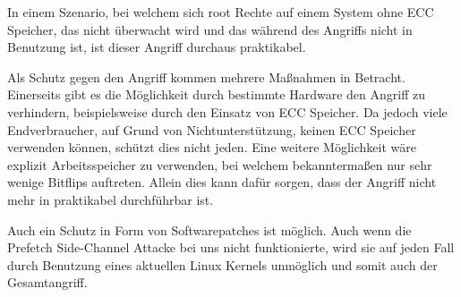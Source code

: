 In einem Szenario, bei welchem sich root Rechte auf einem System ohne ECC Speicher, das nicht überwacht wird und das während des Angriffs nicht in Benutzung ist, ist dieser Angriff durchaus praktikabel.

Als Schutz gegen den Angriff kommen mehrere Maßnahmen in Betracht. Einerseits gibt es die Möglichkeit durch bestimmte Hardware den Angriff zu verhindern, beispielsweise durch den Einsatz von ECC Speicher. Da jedoch viele Endverbraucher, auf Grund von Nichtunterstützung, keinen ECC Speicher verwenden können, schützt dies nicht jeden. Eine weitere Möglichkeit wäre explizit Arbeitsspeicher zu verwenden, bei welchem bekanntermaßen nur sehr wenige Bitflips auftreten. Allein dies kann dafür sorgen, dass der Angriff nicht mehr in praktikabel durchführbar ist.

Auch ein Schutz in Form von Softwarepatches ist möglich. Auch wenn die Prefetch Side-Channel Attacke bei uns nicht funktionierte, wird sie auf jeden Fall durch Benutzung eines aktuellen Linux Kernels unmöglich und somit auch der Gesamtangriff.